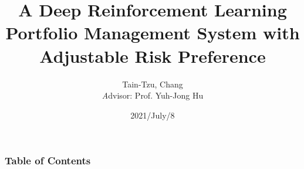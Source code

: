 \documentclass{beamer}
\title{A Deep Reinforcement Learning Portfolio Management System with Adjustable Risk Preference}
\author{
{Tain-Tzu, Chang}
\\
{\textit Advisor:} 
{Prof. Yuh-Jong Hu}
}
\institute{Department of Computer Science, NCCU}
\date{2021/July/8}
\begin{document}
\frame{\titlepage}

\begin{frame}
\frametitle{Table of Contents}
    \begin{columns}[t]
        \begin{column}{.5\textwidth}
            \tableofcontents[sections={1-4},subsectionstyle=hide]
        \end{column}
        \begin{column}{.5\textwidth}
            \tableofcontents[sections={5-8},subsectionstyle=hide]
        \end{column}
    \end{columns}
\end{frame}









\end{document}
